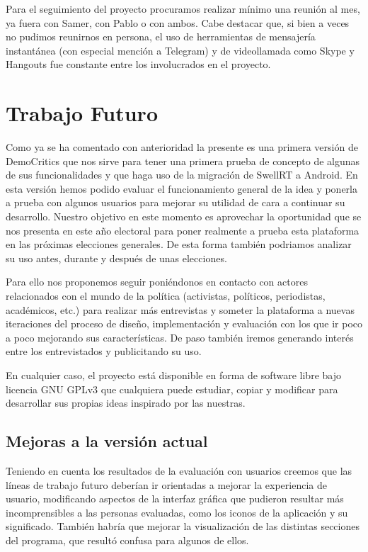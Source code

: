 Para el seguimiento del proyecto procuramos realizar mínimo una reunión al mes, ya fuera con Samer, con Pablo o con ambos. Cabe destacar que, si bien a veces no pudimos reunirnos en persona, el uso de herramientas de mensajería instantánea (con especial mención a Telegram) y de videollamada como Skype y Hangouts fue constante entre los involucrados en el proyecto.

\section{Trabajo Futuro}

Como ya se ha comentado con anterioridad la presente es una primera versión de DemoCritics que nos sirve para tener una primera prueba de concepto de algunas de sus funcionalidades y que haga uso de la migración de SwellRT a Android. En esta versión hemos podido evaluar el funcionamiento general de la idea y ponerla a prueba con algunos usuarios para mejorar su utilidad de cara a continuar su desarrollo. Nuestro objetivo en este momento es aprovechar la oportunidad que se nos presenta en este año electoral para poner realmente a prueba esta plataforma en las próximas elecciones generales. De esta forma también podriamos analizar su uso antes, durante y después de unas elecciones.

Para ello nos proponemos seguir poniéndonos en contacto con actores relacionados con el mundo de la política (activistas, políticos, periodistas, académicos, etc.) para realizar más entrevistas y someter la plataforma a nuevas iteraciones del proceso de diseño, implementación y evaluación con los que ir poco a poco mejorando sus características. De paso también iremos generando interés entre los entrevistados y publicitando su uso.

En cualquier caso, el proyecto está disponible en forma de software libre bajo licencia GNU GPLv3 que cualquiera puede estudiar, copiar y modificar para desarrollar sus propias ideas inspirado por las nuestras. 

\subsection{Mejoras a la versión actual}

Teniendo en cuenta los resultados de la evaluación con usuarios creemos que las líneas de trabajo futuro deberían ir orientadas a mejorar la experiencia de usuario, modificando aspectos de la interfaz gráfica que pudieron resultar más incomprensibles a las personas evaluadas, como los iconos de la aplicación y su significado. También habría que mejorar la visualización de las distintas secciones del programa, que resultó confusa para algunos de ellos. 

